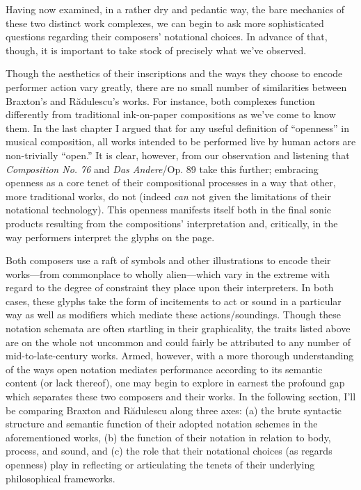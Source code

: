         Having now examined, in a rather dry and pedantic way, the bare mechanics of these two distinct work complexes, we can begin to ask more sophisticated questions regarding their composers' notational choices. In advance of that, though, it is important to take stock of precisely what we've observed. 
    
        Though the aesthetics of their inscriptions and the ways they choose to encode performer action vary greatly, there are no small number of similarities between Braxton's and R\u{a}dulescu's works. For instance, both complexes function differently from traditional ink-on-paper compositions as we've come to know them. In the last chapter I argued that for any useful definition of ``openness'' in musical composition, all works intended to be performed live by human actors are non-trivially ``open.'' It is clear, however, from our observation and listening that \textit{Composition No. 76} and \textit{Das Andere}/Op. 89 take this further; embracing openness as a core tenet of their compositional processes in a way that other, more traditional works, do not (indeed \textit{can} not given the limitations of their notational technology). This openness manifests itself both in the final sonic products resulting from the compositions' interpretation and, critically, in the way performers interpret the glyphs on the page.
        
        Both composers use a raft of symbols and other illustrations to encode their works---from commonplace to wholly alien---which vary in the extreme with regard to the degree of constraint they place upon their interpreters. In both cases, these glyphs take the form of incitements to act or sound in a particular way as well as modifiers which mediate these actions/soundings. Though these notation schemata are often startling in their graphicality, the traits listed above are on the whole not uncommon and could fairly be attributed to any number of mid-to-late-century works. Armed, however, with a more thorough understanding of the ways open notation mediates performance according to its semantic content (or lack thereof), one may begin to explore in earnest the profound gap which separates these two composers and their works. In the following section, I'll be comparing Braxton and R\u{a}dulescu along three axes: (a) the brute syntactic structure and semantic function of their adopted notation schemes in the aforementioned works, (b) the function of their notation in relation to body, process, and sound, and (c) the role that their notational choices (as regards openness) play in reflecting or articulating the tenets of their underlying philosophical frameworks.

